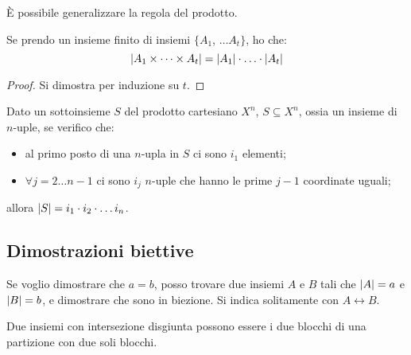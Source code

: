 \`E possibile generalizzare la regola del prodotto.
\begin{prop}
Se prendo un insieme finito di insiemi $\{ A_1$, $ \dots A_t \}$, ho che:
\[
\left\lvert{A_1 \times \dots \times A_t}\right\rvert = \left\lvert{A_1}\right\rvert \cdot \ldots \cdot \left\lvert{A_t}\right\rvert
\]
\end{prop}
\begin{proof}
Si dimostra per induzione su $t$.
\end{proof}

\begin{defn}
Dato un sottoinsieme $S$ del prodotto cartesiano $X^n$, $S \subseteq X^n$, ossia un insieme di $n$-uple, se verifico che:
\begin{itemize}
  \item al primo posto di una $n$-upla in $S$ ci sono $i_1$ elementi;
  \item $\forall j = 2 \dots n-1$ ci sono $i_j$ $n$-uple che hanno le prime $j-1$ coordinate uguali;
\end{itemize}
allora $\left\lvert{S}\right\rvert = i_1 \cdot i_2 \cdot \dots i_n$.
\end{defn}

\subsection{Dimostrazioni biettive}

Se voglio dimostrare che $a = b$, posso trovare due insiemi $A$ e $B$ tali che $\left\lvert{A}\right\rvert = a$ e $\left\lvert{B}\right\rvert = b$, e dimostrare che sono in biezione. Si indica solitamente con $A \leftrightarrow B$.

Due insiemi con intersezione disgiunta possono essere i due blocchi di una partizione con due soli blocchi.

